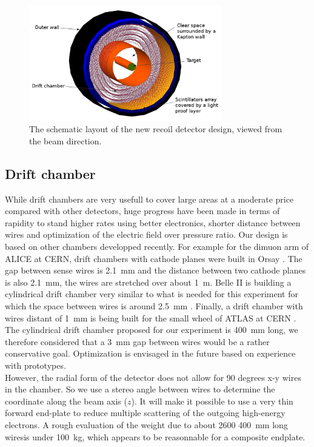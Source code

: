 \begin{figure}[ht!]
  \begin{center}
    \includegraphics[angle=0, width=0.75\textwidth]{./../Detector/fig-chap2/View_det_names.pdf}
    \caption{The schematic layout of the new recoil detector design, viewed from the beam direction.}
    \label{fig:new_lay}
  \end{center}
\end{figure}

\subsection{Drift chamber}

While drift chambers are very usefull to cover large areas at a moderate price compared with other detectors, huge progress have been made in terms of rapidity to stand higher rates using better electronics, shorter distance between wires and optimization of the electric field over pressure ratio. Our design is based on other chambers developped recently. For example for the dimuon arm of ALICE at CERN, drift chambers with cathode planes were built in Orsay \cite{AliceMuonArmChamber}. The gap between sense wires is 2.1~mm and the distance between two cathode planes is also 2.1~mm, the wires are stretched over about 1~m. Belle II is building a cylindrical drift chamber very similar to what is needed for this experiment for which the space between wires is around 2.5~mm \cite{BelleIItdr}. Finally, a drift chamber with wires distant of 1~mm is being built for the small wheel of ATLAS at CERN \cite{ATLASChamber}. The cylindrical drift chamber proposed for our experiment is 400~mm long, we therefore considered that a 3~mm gap between wires would be a rather conservative goal. Optimization is envisaged in the future based on experience with prototypes. \\

However, the radial form of the detector does not allow for 90 degrees x-y wires in the chamber. So we use a stereo angle between wires to determine the coordinate along the beam axis ($z$). It will make it possible to use a very thin forward end-plate to reduce multiple scattering of the outgoing high-energy electrons. A rough evaluation of the weight due to about 2600 400~mm long wiresis under 100~kg, which appears to be reasonnable for a composite endplate. \\

